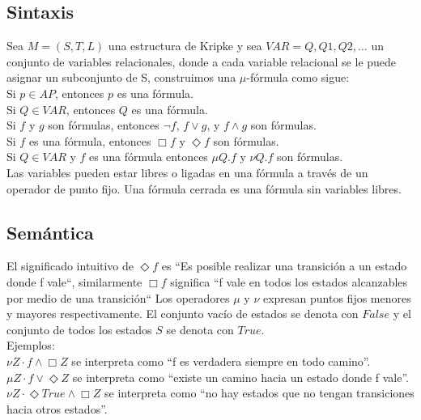 \subsection{Sintaxis}

Sea $M = (S, T, L)$ una estructura de Kripke y sea $VAR = {Q, Q1, Q2, …}$ un conjunto de variables relacionales, donde a cada variable relacional se le puede asignar un subconjunto de S, construimos una $\mu$-fórmula como sigue: \\

Si $p \in AP$, entonces $p$ es una fórmula. \\
Si $Q \in VAR$, entonces $Q$ es una fórmula. \\
Si $f$ y $g$ son fórmulas, entonces $\neg f$, $f \lor g$, y $f \land g$ son fórmulas. \\
Si $f$ es una fórmula, entonces $\Box f$ y $\Diamond f$ son fórmulas. \\
Si $Q \in VAR$ y $f$ es una fórmula entonces $\mu Q.f$ y $\nu Q.f$ son fórmulas. \\

Las variables pueden estar libres o ligadas en una fórmula a través de un operador de punto fijo. Una fórmula cerrada es una fórmula sin variables libres.

\subsection{Semántica}

El significado intuitivo de $\Diamond f$ es “Es posible realizar una transición a un estado donde f vale“, similarmente $\Box f$ significa “f vale en todos los estados alcanzables por medio de una transición“
Los operadores $\mu$ y $\nu$ expresan puntos fijos menores y mayores respectivamente. El conjunto vacío de estados se denota con $False$ y el conjunto de todos los estados $S$ se denota con $True$.\\

Ejemplos: \\

$\nu Z \cdot f \land \Box Z$ se interpreta como “f es verdadera siempre en todo camino”.\\
$\mu Z \cdot f \lor \Diamond Z$ se interpreta como “existe un camino hacia un estado donde f vale”.\\
$\nu Z \cdot \Diamond True \land \Box Z$ se interpreta como “no hay estados que no tengan transiciones hacia otros estados”.\\

